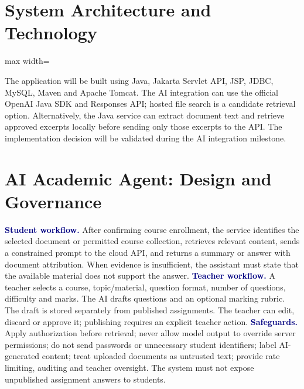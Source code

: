 \documentclass[11pt,a4paper]{article}
\newcommand{\heading}[1]{\vspace{5pt}\textcolor{navy}{\textbf{#1}}}
\begin{document}
\section{System Architecture and Technology}
\begin{center}\begin{adjustbox}{max width=\linewidth}\end{adjustbox}\end{center}
The application will be built using Java, Jakarta Servlet API, JSP, JDBC, MySQL, Maven and Apache Tomcat. The AI integration can use the official OpenAI Java SDK and Responses API; hosted file search is a candidate retrieval option. Alternatively, the Java service can extract document text and retrieve approved excerpts locally before sending only those excerpts to the API. The implementation decision will be validated during the AI integration milestone.
\section{AI Academic Agent: Design and Governance}
\heading{Student workflow.} After confirming course enrollment, the service identifies the selected document or permitted course collection, retrieves relevant content, sends a constrained prompt to the cloud API, and returns a summary or answer with document attribution. When evidence is insufficient, the assistant must state that the available material does not support the answer.
\heading{Teacher workflow.} A teacher selects a course, topic/material, question format, number of questions, difficulty and marks. The AI drafts questions and an optional marking rubric. The draft is stored separately from published assignments. The teacher can edit, discard or approve it; publishing requires an explicit teacher action.
\heading{Safeguards.} Apply authorization before retrieval; never allow model output to override server permissions; do not send passwords or unnecessary student identifiers; label AI-generated content; treat uploaded documents as untrusted text; provide rate limiting, auditing and teacher oversight. The system must not expose unpublished assignment answers to students.
\end{document}
